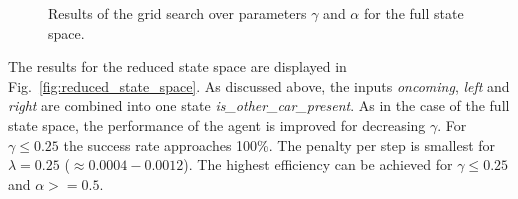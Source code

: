\documentclass[11pt]{article}
\begin{document}
\begin{figure}[ht]
    \centering
    \caption{Results of the grid search over parameters $\gamma$ and $\alpha$ for the full state space.}
    \label{fig:full_state_space}
\end{figure}

The results for the reduced state space are displayed in Fig.~\ref{fig:reduced_state_space}. As discussed above, the inputs \textit{oncoming}, \textit{left} and \textit{right} are combined into one state \textit{is\_other\_car\_present}. As in the case of the full state space, the performance of the agent is improved for decreasing $\gamma$. For $\gamma \le 0.25$ the success rate approaches 100\%. The penalty per step is smallest for $\lambda = 0.25$ ($\approx 0.0004 - 0.0012$). The highest efficiency can be achieved for $\gamma \le 0.25$ and $\alpha >= 0.5$.
\end{document}
